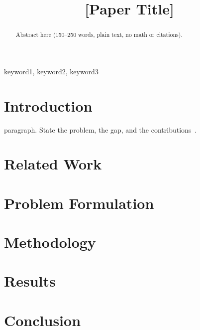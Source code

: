 \documentclass[conference]{IEEEtran} %
\begin{document}
\title{[Paper Title]}

\author{
}

\maketitle

\begin{abstract}
Abstract here (150--250 words, plain text, no math or citations).
\end{abstract}

\begin{IEEEkeywords}
keyword1, keyword2, keyword3
\end{IEEEkeywords}

\section{Introduction}
 paragraph. State the problem, the gap, and the contributions~\cite{example2024key}.

\section{Related Work}

\section{Problem Formulation}

\section{Methodology}

\section{Results}

\section{Conclusion}



\end{document}
